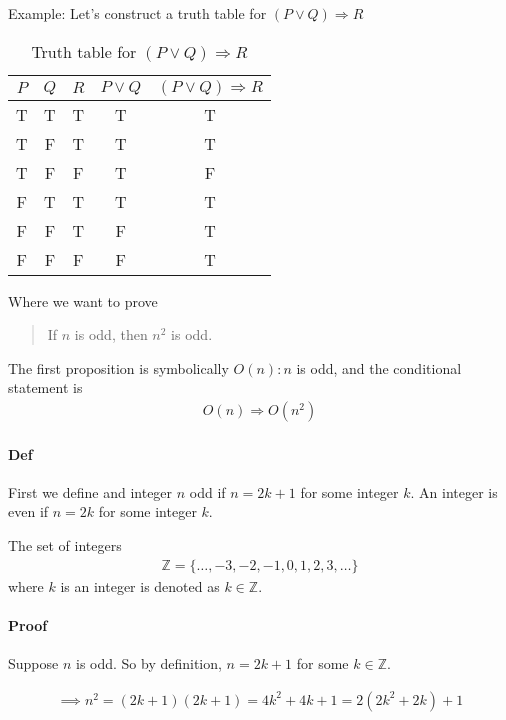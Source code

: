 \documentclass[../main.tex]{subfiles}
\begin{document}
Example: Let's construct a truth table for $(P \lor Q) \Rightarrow R$
\begin{table}[ht]
    \centering
    \begin{tabular}{c|c|c|c|c}
        $P$ & $Q$ & $R$ & $P \lor Q$ & $(P \lor Q) \Rightarrow R$ \\
        \hline
        T & T & T & T & T \\
        T & F & T & T & T \\
        T & F & F & T & F \\
        F & T & T & T & T \\
        F & F & T & F & T \\
        F & F & F & F & T
    \end{tabular}
    \caption{Truth table for $(P \lor Q) \Rightarrow R$}
\end{table}

Where we want to prove
\begin{quote}
    If $n$ is odd, then $n^2$ is odd.
\end{quote}
The first proposition is symbolically $O(n): n$ is odd, and the conditional statement is
\begin{align*}
    O(n) \Rightarrow O(n^2)
\end{align*}
\paragraph{Def}

First we define and integer $n$ odd if $n = 2k + 1$ for some integer $k$. An integer is even if
$n = 2k$ for some integer $k$. 

\begin{remark}
    The set of integers
    \begin{align*}
        \mathbb{Z} = \{ \dots, -3, -2, -1, 0, 1, 2, 3, \dots \}
    \end{align*}
    where $k$ is an integer is denoted as $k \in \mathbb{Z}$.
\end{remark}


\paragraph{Proof}

Suppose $n$ is odd. So by definition, $n = 2k + 1$ for some $k \in \mathbb{Z}$.

\begin{align*}
    \implies n^2 = (2k + 1) (2k + 1) = 4k^2 + 4k + 1 = 2(2k^2 + 2k) + 1
\end{align*}
\end{document}
